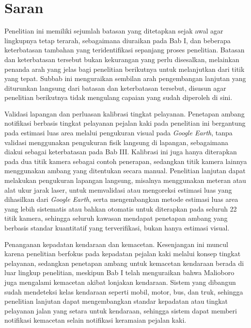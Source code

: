 \section{Saran}
\label{sec:saran}

Penelitian ini memiliki sejumlah batasan yang ditetapkan sejak awal agar lingkupnya tetap 
terarah, sebagaimana diuraikan pada Bab I, dan beberapa keterbatasan tambahan yang 
teridentifikasi sepanjang proses penelitian. Batasan dan keterbatasan tersebut bukan 
kekurangan yang perlu disesalkan, melainkan penanda arah yang jelas bagi penelitian 
berikutnya untuk melanjutkan dari titik yang tepat. Subbab ini menguraikan sembilan arah 
pengembangan lanjutan yang diturunkan langsung dari batasan dan keterbatasan tersebut, 
disusun agar penelitian berikutnya tidak mengulang capaian yang sudah diperoleh di sini.

Validasi lapangan dan perluasan kalibrasi tingkat pelayanan. Penetapan ambang 
notifikasi berbasis tingkat pelayanan pejalan kaki pada penelitian ini bergantung pada 
estimasi luas area melalui pengukuran visual pada \textit{Google Earth}, tanpa validasi 
menggunakan pengukuran fisik langsung di lapangan, sebagaimana diakui sebagai keterbatasan 
pada Bab III. Kalibrasi ini juga hanya diterapkan pada dua titik kamera sebagai contoh 
penerapan, sedangkan titik kamera lainnya menggunakan ambang yang ditentukan secara manual. 
Penelitian lanjutan dapat melakukan pengukuran lapangan langsung, misalnya menggunakan 
meteran atau alat ukur jarak laser, untuk memvalidasi atau mengoreksi estimasi luas yang 
dihasilkan dari \textit{Google Earth}, serta mengembangkan metode estimasi luas area yang 
lebih sistematis atau bahkan otomatis untuk diterapkan pada seluruh 22 titik kamera, 
sehingga seluruh kawasan mendapat penetapan ambang yang berbasis standar kuantitatif yang 
terverifikasi, bukan hanya estimasi visual.

Penanganan kepadatan kendaraan dan kemacetan. Kesenjangan ini muncul karena penelitian 
berfokus pada kepadatan pejalan kaki melalui konsep tingkat pelayanan, sedangkan penetapan 
ambang untuk kemacetan kendaraan berada di luar lingkup penelitian, meskipun Bab I telah 
menguraikan bahwa Malioboro juga mengalami kemacetan akibat lonjakan kendaraan. Sistem 
yang dibangun sudah mendeteksi kelas kendaraan seperti mobil, motor, bus, dan truk, 
sehingga penelitian lanjutan dapat mengembangkan standar kepadatan atau tingkat pelayanan 
jalan yang setara untuk kendaraan, sehingga sistem dapat memberi notifikasi kemacetan 
selain notifikasi keramaian pejalan kaki.

